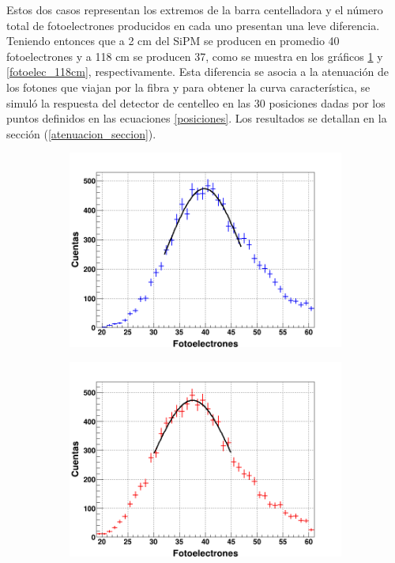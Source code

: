 \documentclass[12pt,oneside,openany,letter]{book}
\begin{document}
Estos dos casos representan los extremos de la barra centelladora y el número total de fotoelectrones producidos en cada uno presentan una leve diferencia. Teniendo entonces que a 2 cm del SiPM se producen en promedio 40 fotoelectrones y a 118 cm se producen 37, como se muestra en los gráficos \ref{fotoelec_2cm} y \ref{fotoelec_118cm}, respectivamente. Esta diferencia se asocia a la atenuación de los fotones que viajan por la fibra y para obtener la curva característica, se simuló la respuesta del detector de centelleo en las 30 posiciones dadas por los puntos definidos en las ecuaciones \ref{posiciones}. Los resultados se detallan en la sección (\ref{atenuacion_seccion}).
\begin{figure}[h!]
    \centering
    \begin{subfigure}{0.6\textwidth}
        \includegraphics[width=\textwidth]{fotoelec_2cm.png}
        \caption{}
        \label{fotoelec_2cm}
    \end{subfigure}
    \begin{subfigure}{0.6\textwidth}
        \includegraphics[width=\textwidth]{fotoelec_118cm.png}

\end{subfigure}
\end{figure}
\end{document}

